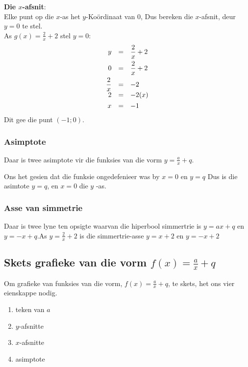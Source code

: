 \textbf{Die $x$-afsnit}: \\
Elke punt op die $x$-as het $y$-Ko\"ordinaat van $0$, Dus bereken die $x$-afsnit, deur $y=0$ te stel.\\
As $g(x)=\frac{2}{x}+2$ stel $y=0$:
\begin{equation*}
\begin{array}{ccl}
\hfill y& =& \dfrac{2}{x}+2\hfill \vspace{4pt}\\
 \hfill 0& =& \dfrac{2}{x}+2\hfill \vspace{4pt} \\
 \hfill \dfrac{2}{x}& =& -2\hfill \\
 \hfill 2& =& -2(x)\hfill \vspace{4pt}\\
 \hfill x& =& -1\hfill 
\end{array}
\end{equation*}
Dit gee die punt  $(-1; 0)$.


\subsubsection*{Asimptote}

Daar is twee asimptote vir die funksies van die vorm $y=\frac{a}{x}+q$. \par 
Ons het gesien dat die funksie ongedefenieer was by $x=0$ en $y=q$ Dus is die asimtote $y=q$, en $x=0$ die $y$ -as. 

\subsubsection*{Asse van simmetrie}
Daar is twee lyne ten opsigte waarvan die hiperbool simmertrie is $y=ax+q$ en $y = -x +q$.As $y = \frac{2}{x} + 2$ is die simmertrie-asse $y = x + 2$ en $y = -x + 2$


\subsection*{Skets grafieke van die vorm  $f(x)=\frac{a}{x}+q$}

Om grafieke van funksies van die vorm, $f(x)=\frac{a}{x}+q$, te skets, het ons vier eienskappe nodig.
\begin{enumerate}[noitemsep, label=\textbf{\arabic*}. ] 
\item teken van $a$
\item $y$-afsnitte
\item $x$-afsnitte
\item asimptote
\end{enumerate}

